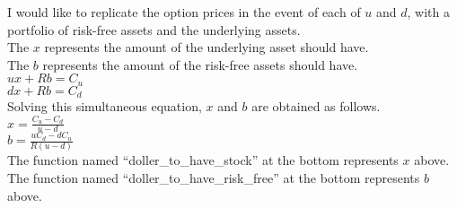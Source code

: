 \documentclass[11pt]{article}
\begin{document}
I would like to replicate the option prices in the event of each of
\(u\) and \(d\), with a portfolio of risk-free assets and the underlying
assets.\\
The \(x\) represents the amount of the underlying asset should have.\\
The \(b\) represents the amount of the risk-free assets should have.\\
\(ux + Rb = C_u\)\\
\(dx + Rb = C_d\)\\
Solving this simultaneous equation, \(x\) and \(b\) are obtained as
follows.\\
\(x = \frac{C_u - C_d}{u - d}\)\\
\(b = \frac{uC_d - dC_u}{R(u - d)}\)\\
The function named ``doller\_to\_have\_stock'' at the bottom represents
\(x\) above.\\
The function named ``doller\_to\_have\_risk\_free'' at the bottom
represents \(b\) above.
\end{document}
